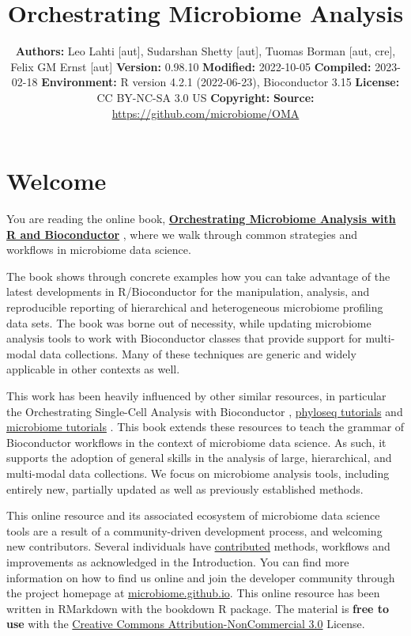 \documentclass[
]{book}
\title{Orchestrating Microbiome Analysis}
\author{}
\date{\vspace{-2.5em}\textbf{Authors:} Leo Lahti {[}aut{]}, Sudarshan Shetty {[}aut{]}, Tuomas Borman {[}aut, cre{]}, Felix GM Ernst {[}aut{]} \textbf{Version:} 0.98.10 \textbf{Modified:} 2022-10-05 \textbf{Compiled:} 2023-02-18 \textbf{Environment:} R version 4.2.1 (2022-06-23), Bioconductor 3.15 \textbf{License:} CC BY-NC-SA 3.0 US \textbf{Copyright:} \textbf{Source:} \url{https://github.com/microbiome/OMA}}
\begin{document}
\maketitle

{
\setcounter{tocdepth}{1}
\tableofcontents
}
\hypertarget{welcome}{%
\chapter*{Welcome}\label{welcome}}

You are reading the online book, \href{microbiome.github.io/OMA}{\textbf{Orchestrating Microbiome Analysis
with R and Bioconductor}} \citep{OMA}, where we
walk through common strategies and workflows in microbiome data
science.

The book shows through concrete examples how you can take advantage of
the latest developments in R/Bioconductor for the manipulation,
analysis, and reproducible reporting of hierarchical and heterogeneous
microbiome profiling data sets. The book was borne out of necessity,
while updating microbiome analysis tools to work with Bioconductor
classes that provide support for multi-modal data collections. Many of
these techniques are generic and widely applicable in other contexts
as well.

This work has been heavily influenced by other similar resources, in
particular the Orchestrating Single-Cell Analysis with Bioconductor
\citep{Amezquita2020}, \href{http://joey711.github.io/phyloseq/tutorials-index}{phyloseq
tutorials}
\citep{Callahan2016} and \href{https://microbiome.github.io/tutorials/}{microbiome
tutorials} \citep{Shetty2019}.
This book extends these resources to teach the grammar of Bioconductor
workflows in the context of microbiome data science. As such, it
supports the adoption of general skills in the analysis of large,
hierarchical, and multi-modal data collections. We focus on microbiome
analysis tools, including entirely new, partially updated as well as
previously established methods.

This online resource and its associated ecosystem of microbiome data
science tools are a result of a community-driven development process,
and welcoming new contributors. Several individuals have
\href{https://github.com/microbiome/OMA/graphs/contributors}{contributed}
methods, workflows and improvements as acknowledged in the
Introduction. You can find more information on how to find us online
and join the developer community through the project homepage at
\href{https://microbiome.github.io}{microbiome.github.io}. This online
resource has been written in RMarkdown with the bookdown R
package. The material is \textbf{free to use} with the \href{https://creativecommons.org/licenses/by-nc/3.0/us/}{Creative Commons
Attribution-NonCommercial
3.0} License.
\end{document}
